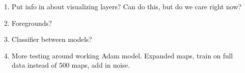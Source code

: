 \documentclass{article}
\begin{document}
\begin{enumerate}
			\item Put info in about visualizing layers?  Can do this, but do we care right now?

			\item Foregrounds?

			\item Classifier between models?

			\item More testing around working Adam model.  Expanded maps, train on full data instead of 500 maps, add in noise.
		\end{enumerate}


	
% 
\end{document}
